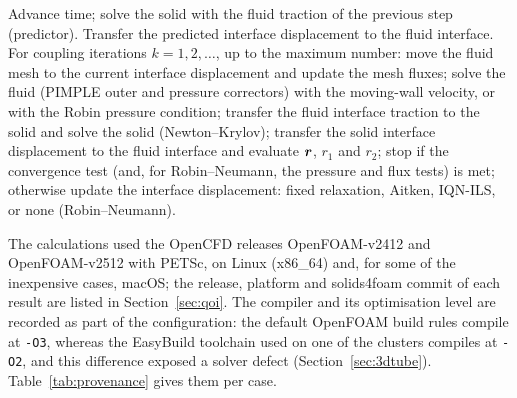 \begin{algorithm}[htbp]
\caption{Partitioned FSI procedure for one time step (solids4foam \texttt{fluidSolidInterface}).}
\label{alg:partitioned_fsi}
\begin{algorithmic}[1]
\State Advance time; solve the solid with the fluid traction of the previous step (predictor).
\State Transfer the predicted interface displacement to the fluid interface.
\State For coupling iterations $k = 1, 2, \ldots$, up to the maximum number:
\State \hspace{1.5em}move the fluid mesh to the current interface displacement and update the mesh fluxes;
\State \hspace{1.5em}solve the fluid (PIMPLE outer and pressure correctors) with the moving-wall velocity, or with the Robin pressure condition;
\State \hspace{1.5em}transfer the fluid interface traction to the solid and solve the solid (Newton--Krylov);
\State \hspace{1.5em}transfer the solid interface displacement to the fluid interface and evaluate $\boldsymbol{r}$, $r_1$ and $r_2$;
\State \hspace{1.5em}stop if the convergence test (and, for Robin--Neumann, the pressure and flux tests) is met;
\State \hspace{1.5em}otherwise update the interface displacement: fixed relaxation, Aitken, IQN-ILS, or none (Robin--Neumann).
\end{algorithmic}
\end{algorithm}

The calculations used the OpenCFD releases OpenFOAM-v2412 and OpenFOAM-v2512 with PETSc, on Linux (x86\_64) and, for some of the inexpensive cases, macOS; the release, platform and solids4foam commit of each result are listed in Section~\ref{sec:qoi}.
The compiler and its optimisation level are recorded as part of the configuration: the default OpenFOAM build rules compile at \texttt{-O3}, whereas the EasyBuild toolchain used on one of the clusters compiles at \texttt{-O2}, and this difference exposed a solver defect (Section~\ref{sec:3dtube}).
Table~\ref{tab:provenance} gives them per case.
